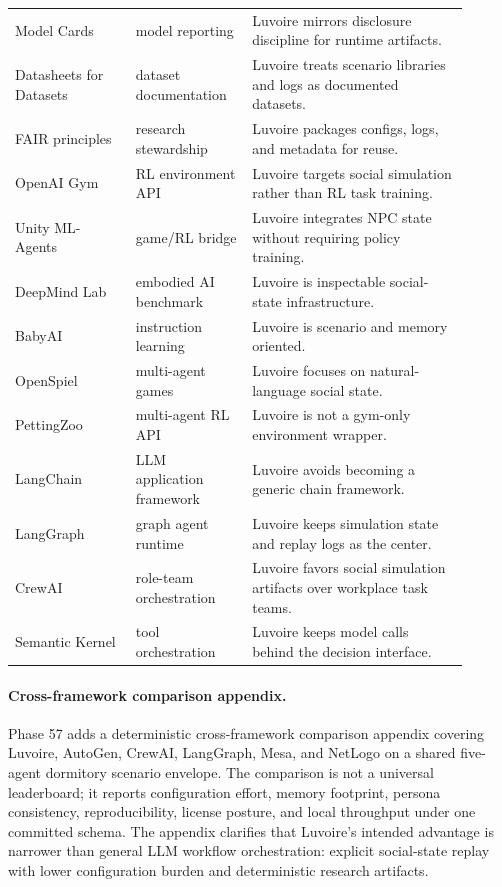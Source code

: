 \begin{longtable}{p{0.24\linewidth}p{0.23\linewidth}p{0.43\linewidth}}
Model Cards & model reporting & Luvoire mirrors disclosure discipline for runtime artifacts. \\
Datasheets for Datasets & dataset documentation & Luvoire treats scenario libraries and logs as documented datasets. \\
FAIR principles & research stewardship & Luvoire packages configs, logs, and metadata for reuse. \\
OpenAI Gym & RL environment API & Luvoire targets social simulation rather than RL task training. \\
Unity ML-Agents & game/RL bridge & Luvoire integrates NPC state without requiring policy training. \\
DeepMind Lab & embodied AI benchmark & Luvoire is inspectable social-state infrastructure. \\
BabyAI & instruction learning & Luvoire is scenario and memory oriented. \\
OpenSpiel & multi-agent games & Luvoire focuses on natural-language social state. \\
PettingZoo & multi-agent RL API & Luvoire is not a gym-only environment wrapper. \\
LangChain & LLM application framework & Luvoire avoids becoming a generic chain framework. \\
LangGraph & graph agent runtime & Luvoire keeps simulation state and replay logs as the center. \\
CrewAI & role-team orchestration & Luvoire favors social simulation artifacts over workplace task teams. \\
Semantic Kernel & tool orchestration & Luvoire keeps model calls behind the decision interface. \\
\bottomrule
\end{longtable}

\paragraph{Cross-framework comparison appendix.} Phase 57 adds a deterministic cross-framework comparison appendix covering Luvoire, AutoGen, CrewAI, LangGraph, Mesa, and NetLogo on a shared five-agent dormitory scenario envelope. The comparison is not a universal leaderboard; it reports configuration effort, memory footprint, persona consistency, reproducibility, license posture, and local throughput under one committed schema. The appendix clarifies that Luvoire's intended advantage is narrower than general LLM workflow orchestration: explicit social-state replay with lower configuration burden and deterministic research artifacts.
